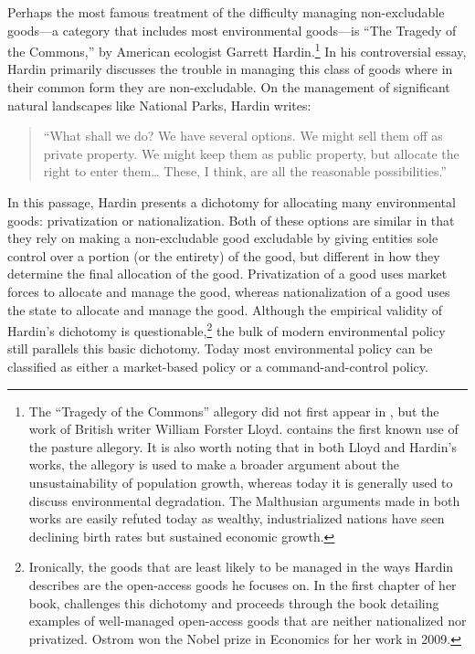 Perhaps the most famous treatment of the difficulty managing non-excludable goods---a category that includes most environmental goods---is ``The Tragedy of the Commons,'' by American ecologist Garrett Hardin.\footnote{The ``Tragedy of the Commons'' allegory did not first appear in \cite{hardin1968tragedy}, but the work of British writer William Forster Lloyd. \cite{lloyd1833two}  contains the first known use of the pasture allegory. It is also worth noting that in both Lloyd and Hardin's works, the allegory is used to make a broader argument about the unsustainability of population growth, whereas today it is generally used to discuss environmental degradation. The Malthusian arguments made in both works are easily refuted today as wealthy, industrialized nations have seen declining birth rates but sustained economic growth.} In his controversial essay, Hardin primarily discusses the trouble in managing this class of goods where in their common form they are non-excludable. On the management of significant natural landscapes like National Parks,  Hardin writes:
\begin{quote}
\singlespacing ``What shall we do? We have several options. We might sell them off as private property. We might keep them as public property, but allocate the right to enter them… These, I think, are all the reasonable possibilities.''
\end{quote}
In this passage, Hardin presents a dichotomy for allocating many environmental goods: privatization or nationalization. Both of these options are similar in that they rely on making a non-excludable good excludable by giving entities sole control over a portion (or the entirety) of the good, but different in how they determine the final allocation of the good. Privatization of a good uses market forces to allocate and manage the good, whereas nationalization of a good uses the state to allocate and manage the good. Although the empirical validity of Hardin's dichotomy is questionable,\footnote{Ironically, the goods that are least likely to be managed in the ways Hardin describes are the open-access goods he focuses on. In the first chapter of her book, \cite{ostrom1990governing} challenges this dichotomy and proceeds through the book detailing examples of well-managed open-access goods that are neither nationalized nor privatized. Ostrom won the Nobel prize in Economics for her work in 2009.} the bulk of modern environmental policy still parallels this basic dichotomy. Today most environmental policy can be classified as either a market-based policy or a command-and-control policy.

